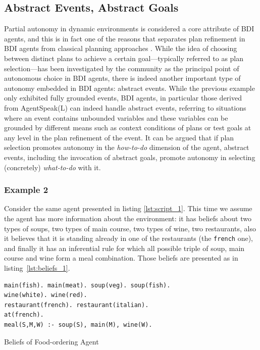 \subsection{Abstract Events, Abstract Goals}
Partial autonomy in dynamic environments is considered a core attribute of BDI agents, and this is in fact one of the reasons that separates plan refinement in BDI agents from classical planning approaches \cite{DeSilva2004}. While the idea of choosing between distinct plans to achieve a certain goal---typically referred to as plan selection---has been investigated by the community as the principal point of autonomous choice in BDI agents, there is indeed another important type of autonomy embedded in BDI agents: abstract events. While the previous example only exhibited fully grounded events, BDI agents, in particular those derived from  AgentSpeak(L)  \cite{Rao1995,RaoAS1996} 
can indeed handle abstract events, referring to situations where an event contains unbounded variables and these variables can be grounded by different means such as context conditions of plans or test goals at any level in the plan refinement of the event. It can be argued that if plan selection promotes autonomy in the \textit{how-to-do} dimension of the agent, abstract events, including the invocation of abstract goals, promote autonomy in selecting (concretely) \textit{what-to-do} with it.

\subsubsection*{Example 2}
Consider the same agent presented in listing \ref{lst:script_1}. This time we assume the agent has more information about the environment: it has beliefs about two types of soups, two types of main course, two types of wine, two restaurants, also it believes that it is standing already in one of the restaurants (the \texttt{french} one), and finally it has an inferential rule for which all possible triple of soup, main course and wine form  a meal combination. Those beliefs are presented as in listing~\ref{lst:beliefs_1}.

\begin{listing}[t]
\centering
\begin{verbatim}
main(fish). main(meat). soup(veg). soup(fish).
wine(white). wine(red).
restaurant(french). restaurant(italian).
at(french).
meal(S,M,W) :- soup(S), main(M), wine(W).
\end{verbatim}
    \caption{Beliefs of Food-ordering Agent}
    \label{lst:beliefs_1}
\end{listing}


